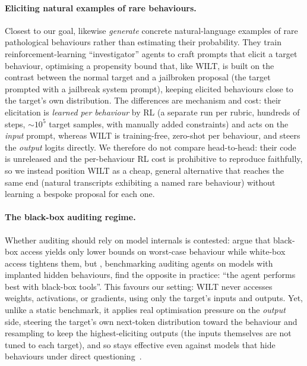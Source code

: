 \paragraph{Eliciting natural examples of rare behaviours.}
Closest to our goal, \citet{chowdhury2025pathological} likewise \emph{generate} concrete natural-language examples of rare pathological behaviours rather than estimating their probability.
They train reinforcement-learning ``investigator'' agents to craft prompts that elicit a target behaviour, optimising a propensity bound that, like WILT, is built on the contrast between the normal target and a jailbroken proposal (the target prompted with a jailbreak system prompt), keeping elicited behaviours close to the target's own distribution.
The differences are mechanism and cost: their elicitation is \emph{learned per behaviour} by RL (a separate run per rubric, hundreds of steps, ${\sim}10^5$ target samples, with manually added constraints) and acts on the \emph{input} prompt, whereas WILT is training-free, zero-shot per behaviour, and steers the \emph{output} logits directly.
We therefore do not compare head-to-head: their code is unreleased and the per-behaviour RL cost is prohibitive to reproduce faithfully, so we instead position WILT as a cheap, general alternative that reaches the same end (natural transcripts exhibiting a named rare behaviour) without learning a bespoke proposal for each one.


\paragraph{The black-box auditing regime.}
Whether auditing should rely on model internals is contested: \citet{casper2024blackbox} argue that black-box access yields only lower bounds on worst-case behaviour while white-box access tightens them, but \citet{sheshadri2026auditbench}, benchmarking auditing agents on models with implanted hidden behaviours, find the opposite in practice: ``the agent performs best with black-box tools''.
This favours our setting: WILT never accesses weights, activations, or gradients, using only the target's inputs and outputs.
Yet, unlike a static benchmark, it applies real optimisation pressure on the \emph{output} side, steering the target's own next-token distribution toward the behaviour and resampling to keep the highest-eliciting outputs (the inputs themselves are not tuned to each target), and so stays effective even against models that hide behaviours under direct questioning~\citep{vanderweij2025sandbagging}.
